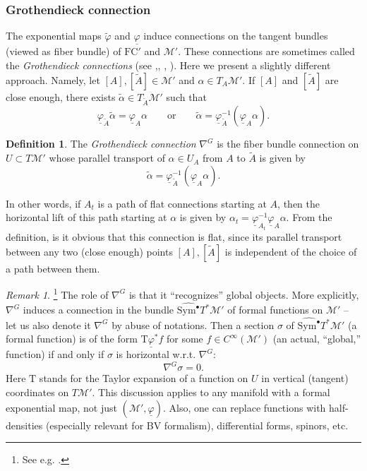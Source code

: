 \documentclass[11pt,a4paper]{amsart}
\theoremstyle{plain} %
\theoremstyle{definition}
\newtheorem{defn}[thm]{Definition}
\theoremstyle{remark}
\newtheorem{rem}[thm]{Remark}
\newcommand{\mr}{\mathrm}
\newcommand{\bt}{\bullet}
\newcommand{\M}{\mathcal{M}}
\newcommand{\wh}{\widehat}
\newcommand{\til}{\widetilde}
\newcommand{\FC}{\mathrm{FC}}
\newcommand{\ul}{\underline}
\begin{document}
{\subsubsection{Grothendieck connection} 
The exponential maps $\til{\varphi}$ and $\underline{\varphi}$ induce   connections on the tangent bundles (viewed as fiber bundle) of $\FC'$ and $\M'$. These connections are sometimes called the \emph{Grothendieck connections} (see \cite{Cattaneo2001a},\cite{Cattaneo2002}, \cite{Cattaneo2019}, \cite{Cattaneo2020}). Here we present a slightly %
different approach. Namely, let $[A],[\til{A}] \in \M'$ and $\alpha \in T_A\M'$. If $[A]$ and $[\til{A}]$ are 
close enough, there exists $\til{\alpha} \in T_{\til{A}}\M'$ such that 
\begin{equation}
    \underline{\varphi}_{\til{A}}\til{\alpha} = \underline{\varphi}_A\alpha \qquad\text{or} \qquad \til{\alpha} = \underline{\varphi}^{-1}_{\til{A}}(\ul{\varphi}_A\alpha). 
\end{equation}
\begin{defn}\label{def: Grothendieck connection}
    The \emph{Grothendieck connection} $\nabla^G$ is the fiber bundle connection on $U \subset T\M'$ whose parallel transport of $\alpha \in U_A$ from $A$ to $\til{A}$ is given by 
    \begin{equation}\label{Grothendieck conn from phi underline}
        \til{\alpha} = \underline{\varphi}^{-1}_{\til{A}}(\underline{\varphi}_A\alpha). 
    \end{equation}
\end{defn}
In other words, if $A_t$ is a path of flat connections starting at $A$, then the horizontal lift of this path starting at $\alpha$ is given by $\alpha_t = \underline{\varphi}_{A_t}^{-1}\underline{\varphi}_A\alpha$. 
From the definition, is it obvious that this connection is flat, since its parallel transport between any two (close enough) points $[A],[\til{A}]$ is independent of the choice of a path between them. 

\begin{rem}\footnote{See e.g. \cite{Bonechi2012}.}
 The role of $\nabla^G$ is that it ``recognizes'' global objects. %
 More explicitly, $\nabla^G$ induces a connection in the bundle $\wh{\mr{Sym}^\bt}T^*\M'$ of formal functions on $\M'$ -- let us also denote it $\nabla^G$ by abuse of notations. Then a section $\sigma$ of $\wh{\mr{Sym}^\bt} T^*\M'$  (a formal function) is of the form $\mr{T}\underline{\varphi}^* f$ for some $f\in C^\infty(\M')$ (an actual, ``global,'' function) if and only if $\sigma$ is horizontal w.r.t. $\nabla^G$:  
 \begin{equation}
 \nabla^G\sigma=0.
 \end{equation} 
 Here $\mr{T}$ stands for the Taylor expansion of a function on $U$ in vertical (tangent) coordinates on $T\M'$.
 This discussion applies to any manifold with a formal exponential map, not just $(\M',\underline{\varphi})$. Also,
 one can replace functions with half-densities (especially relevant for BV formalism), differential forms, spinors, etc.
\end{rem}


}
\end{document}
